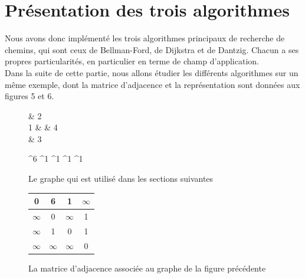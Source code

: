 \documentclass[a4paper,12pt,final] {article}
\begin{document}
\newpage
\section{Présentation des trois algorithmes}

Nous avons donc implémenté les trois algorithmes principaux de recherche de chemins, qui sont ceux de Bellman-Ford, de Dijkstra et de Dantzig. Chacun a ses propres particularités, en particulier en terme de champ d'application.\\

Dans la suite de cette partie, nous allons étudier les différents algorithmes sur un même exemple, dont la matrice d'adjacence et la représentation sont données aux figures 5 et 6.\\ %

\begin{figure}[H]
 \centering
 \begin{psmatrix}[mnode=circle]
	    & 2\\
	 1 &    & 4\\
	    & 3\\
\end{psmatrix}
	
	^{6}
	^{1}
	^{1}
	^{1}
	^{1}

  \caption{Le graphe qui est utilisé dans les sections suivantes}
\end{figure}

\begin{figure}[H]
\begin{center}
\begin{tabular}{|c|c|c|c|}
\hline
0 & 6 & 1 & $\infty$\\
\hline
$\infty$ & 0 & $\infty$ & 1\\
\hline
$\infty$ & 1 & 0 & 1\\
\hline
$\infty$ & $\infty$ & $\infty$ & 0\\
\hline
\end{tabular}
\end{center}
\caption{La matrice d'adjacence associée au graphe de la figure précédente}
\end{figure}

\end{document}
